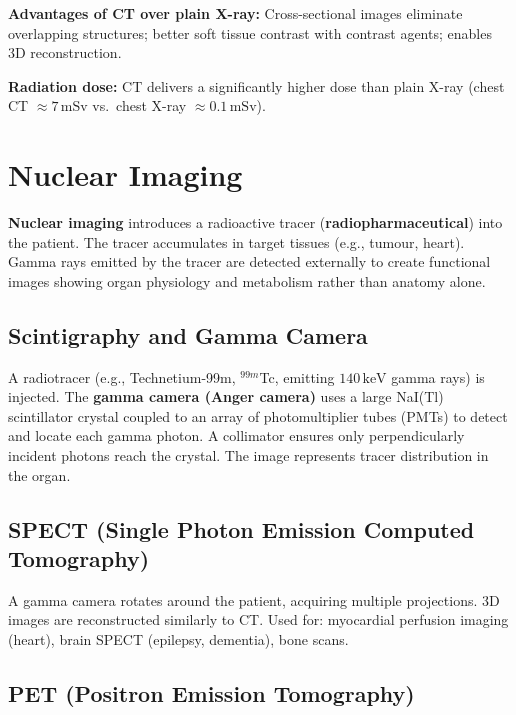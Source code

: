 \documentclass[12pt,a4paper]{article}
\begin{document}
\textbf{Advantages of CT over plain X-ray:} Cross-sectional images eliminate overlapping structures; better soft tissue contrast with contrast agents; enables 3D reconstruction.

\textbf{Radiation dose:} CT delivers a significantly higher dose than plain X-ray (chest CT $\approx 7\,\text{mSv}$ vs.\ chest X-ray $\approx 0.1\,\text{mSv}$).

\section{Nuclear Imaging}

\begin{tcolorbox}[defbox, title={\textbf{Nuclear (Radionuclide) Imaging}}]
\textbf{Nuclear imaging} introduces a radioactive tracer (\textbf{radiopharmaceutical}) into the patient. The tracer accumulates in target tissues (e.g., tumour, heart). Gamma rays emitted by the tracer are detected externally to create functional images showing organ physiology and metabolism rather than anatomy alone.
\end{tcolorbox}

\subsection{Scintigraphy and Gamma Camera}

A radiotracer (e.g., Technetium-99m, $^{99m}$Tc, emitting $140\,\text{keV}$ gamma rays) is injected. The \textbf{gamma camera (Anger camera)} uses a large NaI(Tl) scintillator crystal coupled to an array of photomultiplier tubes (PMTs) to detect and locate each gamma photon. A collimator ensures only perpendicularly incident photons reach the crystal. The image represents tracer distribution in the organ.

\subsection{SPECT (Single Photon Emission Computed Tomography)}

A gamma camera rotates around the patient, acquiring multiple projections. 3D images are reconstructed similarly to CT. Used for: myocardial perfusion imaging (heart), brain SPECT (epilepsy, dementia), bone scans.

\subsection{PET (Positron Emission Tomography)}
\end{document}
